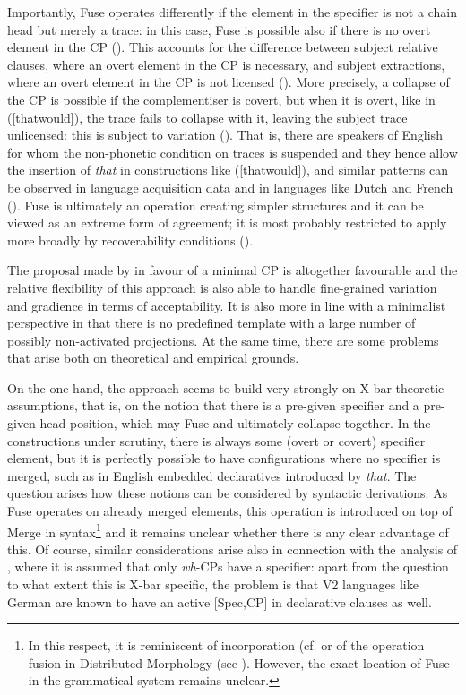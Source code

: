 Importantly, Fuse operates differently if the element in the specifier is not a chain head but merely a trace: in this case, Fuse is possible also if there is no overt element in the CP (\citealt[550--551]{sobin2002}). This accounts for the difference between subject relative clauses, where an overt element in the CP is necessary, and subject extractions, where an overt element in the CP is not licensed (\citealt[550]{sobin2002}). More precisely, a collapse of the CP is possible if the complementiser is covert, but when it is overt, like in (\ref{thatwould}), the trace fails to collapse with it, leaving the subject trace unlicensed: this is subject to variation (\citealt[551]{sobin2002}). That is, there are speakers of English for whom the non-phonetic condition on traces is suspended and they hence allow the insertion of \textit{that} in constructions like (\ref{thatwould}), and similar patterns can be observed in language acquisition data and in languages like Dutch and French (\citealt[552]{sobin2002}). Fuse is ultimately an operation creating simpler structures and it can be viewed as an extreme form of agreement; it is most probably restricted to apply more broadly by recoverability conditions (\citealt[556]{sobin2002}).

The proposal made by \citet{sobin2002} in favour of a minimal CP is altogether favourable and the relative flexibility of this approach is also able to handle fine-grained variation and gradience in terms of acceptability. It is also more in line with a minimalist perspective in that there is no predefined template with a large number of possibly non-activated projections. At the same time, there are some problems that arise both on theoretical and empirical grounds.

On the one hand, the approach seems to build very strongly on X-bar theoretic assumptions, that is, on the notion that there is a pre-given specifier and a pre-given head position, which may Fuse and ultimately collapse together. In the constructions under scrutiny, there is always some (overt or covert) specifier element, but it is perfectly possible to have configurations where no specifier is merged, such as in English embedded declaratives introduced by \textit{that}. The question arises how these notions can be considered by syntactic derivations. As Fuse operates on already merged elements, this operation is introduced on top of Merge in syntax\footnote{In this respect, it is reminiscent of incorporation (cf. \citealt{baker1988} or of the operation fusion in Distributed Morphology (see \citealt{hallemarantz1993}). However, the exact location of Fuse in the grammatical system remains unclear.} and it remains unclear whether there is any clear advantage of this. Of course, similar considerations arise also in connection with the analysis of \citet{browning1996}, where it is assumed that only \textit{wh}-CPs have a specifier: apart from the question to what extent this is X-bar specific, the problem is that V2 languages like German are known to have an active [Spec,CP] in declarative clauses as well.

